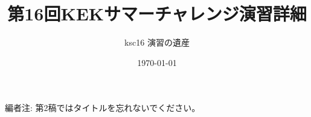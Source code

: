 \documentclass[dvipdfmx]{jsarticle}
\begin{document}
\title{第16回KEKサマーチャレンジ演習詳細}
\author{ksc16 演習の遺産}
\date{\today}
\begin{titlepage}
    \maketitle
    \thispagestyle{empty}
\end{titlepage}


\pagebreak

編者注: 第2稿ではタイトルを忘れないでください。

\pagebreak



\end{document}
